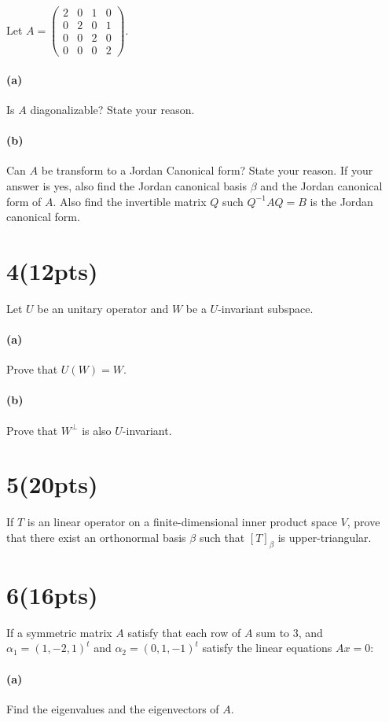 \documentclass{article}
\begin{document}
Let $A=\begin{pmatrix}
    2 & 0 & 1 & 0 \\ 0 & 2 & 0 & 1 \\ 0 & 0 & 2 & 0 \\ 0 & 0 & 0 & 2
\end{pmatrix}$.
\paragraph{(a)} Is $A$ diagonalizable? State your reason.
\paragraph{(b)} Can $A$ be transform to a Jordan Canonical form? State your reason. If your answer is yes, also find the Jordan canonical basis $\beta$ and the Jordan canonical form of $A$. Also find the invertible matrix $Q$ such $Q^{-1}AQ=B$ is the Jordan canonical form. 

\section*{4(12pts)}

Let $U$ be an unitary operator and $W$ be a $U$-invariant subspace. 
\paragraph{(a)} Prove that $U(W)=W$.
\paragraph{(b)} Prove that $W^{\perp}$ is also $U$-invariant.
 
\section*{5(20pts)}
If $T$ is an linear operator on a finite-dimensional inner product space $V$, prove that there exist an orthonormal basis $\beta$ such that $[T]_{\beta}$ is upper-triangular.

\section*{6(16pts)}
If a symmetric matrix $A$ satisfy that each row of $A$ sum to $3$, and $\alpha_1=(1,-2,1)^t$ and $\alpha_2=(0,1,-1)^t$ satisfy the linear equations $Ax=0$:
\paragraph{(a)} Find the eigenvalues and the eigenvectors of $A$.
\end{document}
